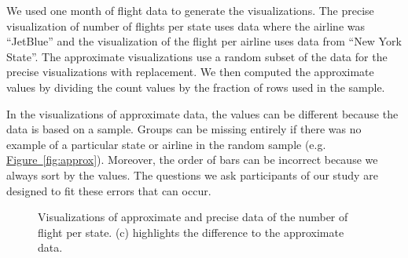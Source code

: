 \documentclass[10pt,journal,compsoc]{IEEEtran}
\newcommand{\figref}[1]{\hyperref[#1]{Figure~\ref*{#1}}}
\begin{document}
We used one month of flight data to generate the visualizations.
The precise visualization of number of flights per state uses data where the airline was ``JetBlue'' and the visualization of the flight per airline uses data from ``New York State''.
The approximate visualizations use a random subset of the data for the precise visualizations with replacement.
We then computed the approximate values by dividing the count values by the fraction of rows used in the sample.

In the visualizations of approximate data, the values can be different because the data is based on a sample.
Groups can be missing entirely if there was no example of a particular state or airline in the random sample (e.g. \figref{fig:approx}).
Moreover, the order of bars can be incorrect because we always sort by the values.
The questions we ask participants of our study are designed to fit these errors that can occur.

\begin{figure}[!ht]
\centering
{}
\hfil
{}
\hfil
{}
\caption{Visualizations of approximate and precise data of the number of flight per state. (c) highlights the difference to the approximate data.}
\label{fig:types}
\end{figure}
\end{document}
